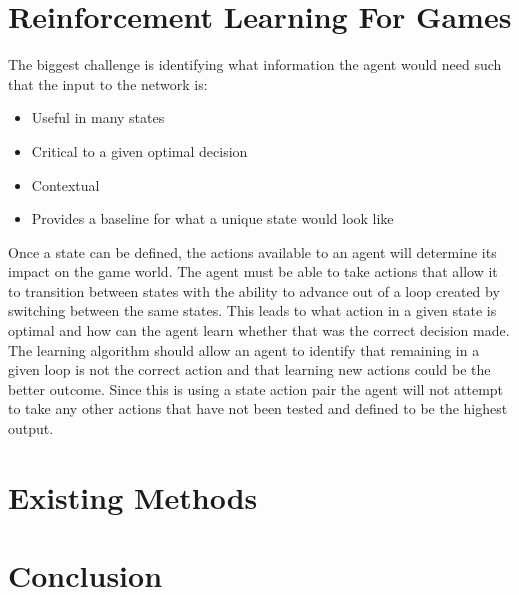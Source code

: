 \section{Reinforcement Learning For Games}
The biggest challenge is identifying what information the agent would need such that the input to the network is:
\begin{itemize}
\item Useful in many states
\item Critical to a given optimal decision
\item Contextual
\item Provides a baseline for what a unique state would look like
\end{itemize}
Once a state can be defined, the actions available to an agent will determine its impact on the game world. The agent must be able to take actions that allow it to transition between states with the ability to advance out of a loop created by switching between the same states.
This leads to what action in a given state is optimal and how can the agent learn whether that was the correct decision made. The learning algorithm should allow an agent to identify that remaining in a given loop is not the correct action and that learning new actions could be the better outcome. Since this is using a state action pair the agent will not attempt to take any other actions that have not been tested and defined to be the highest output.

\section{Existing Methods}

\section{Conclusion}

